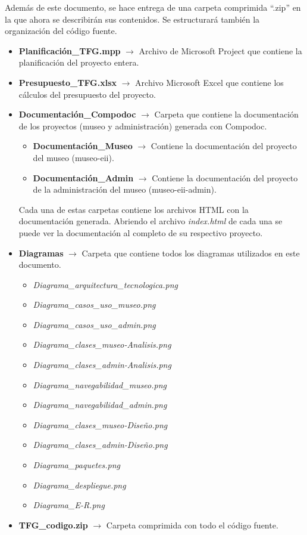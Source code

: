Además de este documento, se hace entrega de una carpeta comprimida ``.zip'' en la que ahora se describirán sus contenidos. Se estructurará también la organización del código fuente.
\begin{itemize}
	\item \textbf{Planificación\_TFG.mpp} \(\rightarrow\) Archivo de Microsoft Project que contiene la planificación del proyecto entera.
	\item \textbf{Presupuesto\_TFG.xlsx} \(\rightarrow\) Archivo Microsoft Excel que contiene los cálculos del presupuesto del proyecto.
	\item \textbf{Documentación\_Compodoc} \(\rightarrow\) Carpeta que contiene la documentación de los proyectos (museo y administración) generada con Compodoc.
	\begin{itemize}
		\item \textbf{Documentación\_Museo} \(\rightarrow\) Contiene la documentación del proyecto del museo (museo-eii).
		\item \textbf{Documentación\_Admin} \(\rightarrow\) Contiene la documentación del proyecto de la administración del museo (museo-eii-admin).
	\end{itemize}
 	Cada una de estas carpetas contiene los archivos HTML con la documentación generada. Abriendo el archivo \textit{index.html} de cada una se puede ver la documentación al completo de su respectivo proyecto.
	\item \textbf{Diagramas} \(\rightarrow\) Carpeta que contiene todos los diagramas utilizados en este documento.
	\begin{itemize}
		\item \textit{Diagrama\_arquitectura\_tecnologica.png}
		\item \textit{Diagrama\_casos\_uso\_museo.png}
		\item \textit{Diagrama\_casos\_uso\_admin.png}
		\item \textit{Diagrama\_clases\_museo-Analisis.png}
		\item \textit{Diagrama\_clases\_admin-Analisis.png}
		\item \textit{Diagrama\_navegabilidad\_museo.png}
		\item \textit{Diagrama\_navegabilidad\_admin.png}
		\item \textit{Diagrama\_clases\_museo-Diseño.png}
		\item \textit{Diagrama\_clases\_admin-Diseño.png}
		\item \textit{Diagrama\_paquetes.png}
		\item \textit{Diagrama\_despliegue.png}
		\item \textit{Diagrama\_E-R.png}
	\end{itemize}
	\item \textbf{TFG\_codigo.zip} \(\rightarrow\) Carpeta comprimida con todo el código fuente.
\end{itemize}

